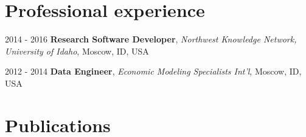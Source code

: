 \documentclass[letterpaper,11pt,oneside]{article}
\begin{document}
\noindent
\section*{\textcolor{gunmetal}{Professional experience}}

  \begin{hangparas}{0.25in}{1}
      2014 - 2016 \quad\textbf{Research Software Developer}, 
        \emph{Northwest Knowledge Network, University of Idaho}, Moscow, ID, USA 

      2012 - 2014 \quad \textbf{Data Engineer}, 
      \emph{Economic Modeling Specialists Int'l}, Moscow, ID, USA 
  \end{hangparas}

\noindent


\noindent
\section*{\textcolor{gunmetal}{Publications}}
\end{document}
